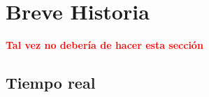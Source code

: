 %
%
%
%


\section{Breve Historia}
\textbf{\textcolor{red}{Tal vez no debería de hacer esta sección}} 


\subsection{Tiempo real}
